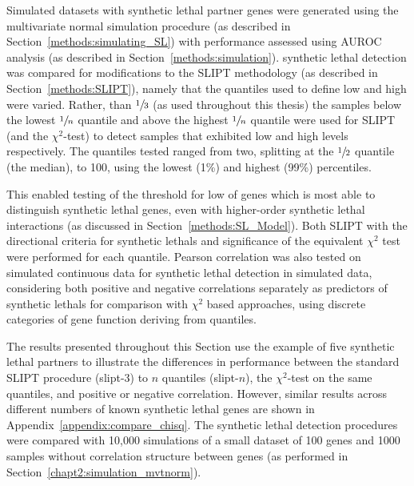 Simulated datasets with \gls{synthetic lethal} partner genes were generated using the multivariate normal simulation procedure (as described in Section~\ref{methods:simulating_SL}) with performance assessed using \gls{AUROC} analysis (as described in Section~\ref{methods:simulation}). \Gls{synthetic lethal} detection was compared for modifications to the \gls{SLIPT} methodology (as described in Section~\ref{methods:SLIPT}), namely that the quantiles used to define low and high  were varied. Rather, than $\sfrac{1}{3}$ (as used throughout this thesis) the samples below the lowest $\sfrac{1}{n}$ quantile and above the highest $\sfrac{1}{n}$ quantile were used for \gls{SLIPT} (and the $\chi^2$-test) to detect samples that exhibited low and high  levels respectively. The quantiles tested ranged from two, splitting at the $\sfrac{1}{2}$ quantile (the median), to 100, using the lowest (1\%) and highest (99\%) percentiles.

This enabled testing of the threshold for low  of genes which is most able to distinguish \gls{synthetic lethal} genes, even with higher-order \gls{synthetic lethal} interactions (as discussed in Section~\ref{methods:SL_Model}). Both \gls{SLIPT} with the directional criteria for \glspl{synthetic lethal} and significance of the equivalent $\chi^2$ test were performed for each quantile. Pearson correlation was also tested on simulated continuous  data for \gls{synthetic lethal} detection in simulated data, considering both positive and negative correlations separately as predictors of \glspl{synthetic lethal} for comparison with $\chi^2$ based approaches, using discrete categories of gene function deriving from quantiles. 

The results presented throughout this Section use the example of five \gls{synthetic lethal} partners to illustrate the differences in performance between the standard \gls{SLIPT} procedure (slipt-3) to $n$ quantiles (slipt-$n$), the $\chi^2$-test on the same quantiles, and positive or negative correlation. However, similar results across different numbers of known \gls{synthetic lethal} genes are shown in Appendix~\ref{appendix:compare_chisq}. The \gls{synthetic lethal} detection procedures were compared with 10,000 simulations of a small dataset of 100 genes and 1000 samples without correlation structure between genes (as performed in Section~\ref{chapt2:simulation_mvtnorm}).

